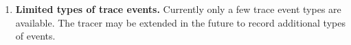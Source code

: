 %


\begin{enumerate}
\item{\bf Limited types of trace events.}
  Currently only a few trace event types are available. The tracer may
  be extended in the future to record additional types of events.
\end{enumerate}



